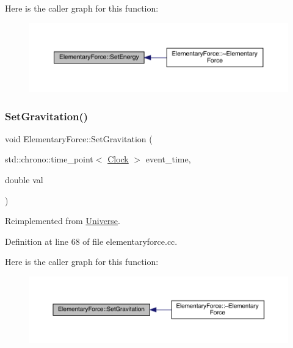 Here is the caller graph for this function\+:
\nopagebreak
\begin{figure}[H]
\begin{center}
\leavevmode
\includegraphics[width=350pt]{class_elementary_force_a466c84ee4a50a29ef1f0fc6509ae3161_icgraph}
\end{center}
\end{figure}
\mbox{\label{class_elementary_force_aa36d5875964f7e2fc981f6fc5431be7f}} 
\subsubsection{\texorpdfstring{Set\+Gravitation()}{SetGravitation()}}
{\footnotesize\ttfamily void Elementary\+Force\+::\+Set\+Gravitation (\begin{DoxyParamCaption}\item[{std\+::chrono\+::time\+\_\+point$<$ \hyperlink{universe_8h_a0ef8d951d1ca5ab3cfaf7ab4c7a6fd80}{Clock} $>$}]{event\+\_\+time,  }\item[{double}]{val }\end{DoxyParamCaption})\hspace{0.3cm}{\ttfamily [virtual]}}



Reimplemented from \hyperlink{class_universe_ae0cb8d86b2fbb8396d605160344b42f5}{Universe}.



Definition at line 68 of file elementaryforce.\+cc.

Here is the caller graph for this function\+:
\nopagebreak
\begin{figure}[H]
\begin{center}
\leavevmode
\includegraphics[width=350pt]{class_elementary_force_aa36d5875964f7e2fc981f6fc5431be7f_icgraph}
\end{center}
\end{figure}
\mbox{\label{class_elementary_force_aa1b5708cfab2069049fec5c924e1f246}} 
